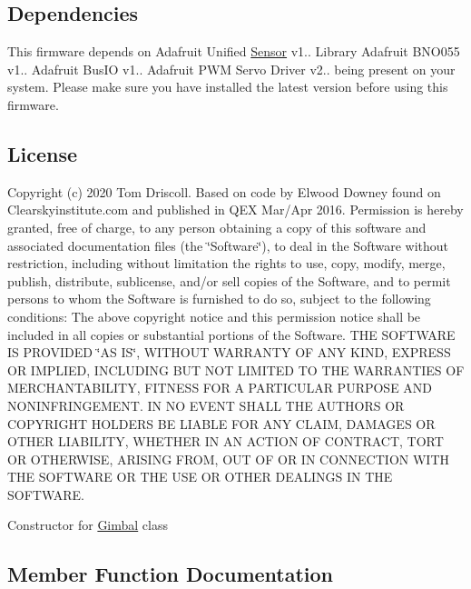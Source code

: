 \hypertarget{main_8cpp_dependencies}{}\subsection{Dependencies}\label{main_8cpp_dependencies}
This firmware depends on Adafruit Unified \hyperlink{class_sensor}{Sensor} v1.. Library Adafruit B\+N\+O055 v1.. Adafruit Bus\+IO v1.. Adafruit P\+WM Servo Driver v2.. being present on your system. Please make sure you have installed the latest version before using this firmware.\hypertarget{main_8cpp_license}{}\subsection{License}\label{main_8cpp_license}
Copyright (c) 2020 Tom Driscoll. Based on code by Elwood Downey found on Clearskyinstitute.\+com and published in Q\+EX Mar/\+Apr 2016. Permission is hereby granted, free of charge, to any person obtaining a copy of this software and associated documentation files (the \char`\"{}\+Software\char`\"{}), to deal in the Software without restriction, including without limitation the rights to use, copy, modify, merge, publish, distribute, sublicense, and/or sell copies of the Software, and to permit persons to whom the Software is furnished to do so, subject to the following conditions\+: The above copyright notice and this permission notice shall be included in all copies or substantial portions of the Software. T\+HE S\+O\+F\+T\+W\+A\+RE IS P\+R\+O\+V\+I\+D\+ED \char`\"{}\+A\+S I\+S\char`\"{}, W\+I\+T\+H\+O\+UT W\+A\+R\+R\+A\+N\+TY OF A\+NY K\+I\+ND, E\+X\+P\+R\+E\+SS OR I\+M\+P\+L\+I\+ED, I\+N\+C\+L\+U\+D\+I\+NG B\+UT N\+OT L\+I\+M\+I\+T\+ED TO T\+HE W\+A\+R\+R\+A\+N\+T\+I\+ES OF M\+E\+R\+C\+H\+A\+N\+T\+A\+B\+I\+L\+I\+TY, F\+I\+T\+N\+E\+SS F\+OR A P\+A\+R\+T\+I\+C\+U\+L\+AR P\+U\+R\+P\+O\+SE A\+ND N\+O\+N\+I\+N\+F\+R\+I\+N\+G\+E\+M\+E\+NT. IN NO E\+V\+E\+NT S\+H\+A\+LL T\+HE A\+U\+T\+H\+O\+RS OR C\+O\+P\+Y\+R\+I\+G\+HT H\+O\+L\+D\+E\+RS BE L\+I\+A\+B\+LE F\+OR A\+NY C\+L\+A\+IM, D\+A\+M\+A\+G\+ES OR O\+T\+H\+ER L\+I\+A\+B\+I\+L\+I\+TY, W\+H\+E\+T\+H\+ER IN AN A\+C\+T\+I\+ON OF C\+O\+N\+T\+R\+A\+CT, T\+O\+RT OR O\+T\+H\+E\+R\+W\+I\+SE, A\+R\+I\+S\+I\+NG F\+R\+OM, O\+UT OF OR IN C\+O\+N\+N\+E\+C\+T\+I\+ON W\+I\+TH T\+HE S\+O\+F\+T\+W\+A\+RE OR T\+HE U\+SE OR O\+T\+H\+ER D\+E\+A\+L\+I\+N\+GS IN T\+HE S\+O\+F\+T\+W\+A\+RE.

Constructor for \hyperlink{class_gimbal}{Gimbal} class 

\subsection{Member Function Documentation}
\mbox{\label{class_gimbal_a391c53aaaa9fb6ec8547d87c3cc09933}} 
